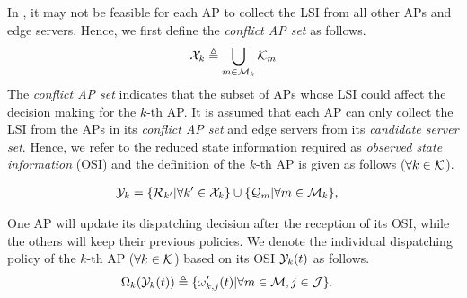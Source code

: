 In , it may not be feasible for each AP to collect the LSI from all other APs and edge servers.
Hence, we first define the \emph{conflict AP set} as follows.
\begin{align}
    \mathcal{X}_{k} \triangleq \bigcup_{m\in\mathcal{M}_{k}} \mathcal{K}_{m}
\end{align}
The \emph{conflict AP set} indicates that the subset of APs whose LSI could affect the decision making for the $k$-th AP.
It is assumed that each AP can only collect the LSI from the APs in its \emph{conflict AP set} and edge servers from its \emph{candidate server set}.
Hence, we refer to the reduced state information required as \emph{observed state information} (OSI) and the definition of the $k$-th AP is given as follows ($\forall k\in\mathcal{K}$).
\begin{definition}
    \begin{align}
        \mathcal{Y}_{k} &= \{\mathcal{R}_{k'} | \forall k'\in\mathcal{X}_{k}\}
                        \cup \{\mathcal{Q}_{m} | \forall m\in\mathcal{M}_{k}\},
    \end{align}
\end{definition}

One AP will update its dispatching decision after the reception of its OSI, while the others will keep their previous policies.
We denote the individual dispatching policy of the $k$-th AP ($\forall k\in\mathcal{K}$) based on its OSI $\mathcal{Y}_{k}(t)$ as follows.
\begin{align}
    &\Omega_{k}(\mathcal{Y}_{k}(t)) \triangleq \{\omega'_{k,j}(t)|\forall m\in\mathcal{M}, j\in\mathcal{J}\}.
    \label{def_action}
\end{align}



